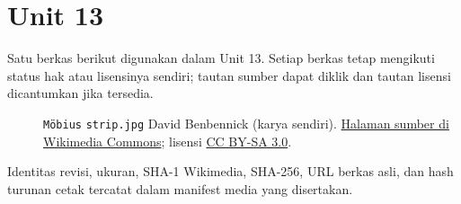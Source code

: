 \section*{Unit 13}
Satu berkas berikut digunakan dalam Unit 13. Setiap berkas tetap mengikuti status hak atau lisensinya sendiri; tautan sumber dapat diklik dan tautan lisensi dicantumkan jika tersedia.
\begin{description}
\item[]\texttt{Möbius} \texttt{strip.jpg}
David Benbennick (karya sendiri).
\href{https://commons.wikimedia.org/wiki/File:M%C3%B6bius_strip.jpg}{Halaman sumber di Wikimedia Commons}; lisensi \href{https://creativecommons.org/licenses/by-sa/3.0/}{CC BY-SA 3.0}.
\end{description}
Identitas revisi, ukuran, SHA-1 Wikimedia, SHA-256, URL berkas asli, dan hash turunan cetak tercatat dalam manifest media yang disertakan.
